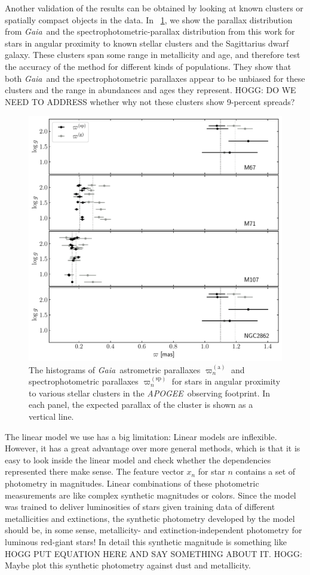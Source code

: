 \documentclass[modern]{aastex62}
\newcommand{\acronym}[1]{{\small{#1}}}
\newcommand{\project}[1]{\textsl{#1}}
\newcommand{\apogee}{\project{\acronym{APOGEE}}}
\newcommand{\gaia}{\project{Gaia}}
\newcommand{\gparallax}{\varpi^{(\mathrm{a})}}
\newcommand{\sparallax}{\varpi^{(\mathrm{sp})}}
\begin{document}
Another validation of the results can be obtained by looking at known
clusters or spatially compact objects in the data.
In \figurename~\ref{fig:clusters}, we show the parallax distribution from \gaia\ and
the spectrophotometric-parallax distribution from this work for stars in
angular proximity to known stellar clusters and the Sagittarius dwarf
galaxy.
These clusters span some range in metallicity and age, and therefore test
the accuracy of the method for different kinds of populations.
They show that both \gaia\ and the spectrophotometric parallaxes appear to be unbiased
for these clusters and the range in abundances and ages they represent.
HOGG: DO WE NEED TO ADDRESS whether why not these clusters show 9-percent spreads?
\begin{figure}
\includegraphics[width=\textwidth]{clusters.pdf}
\caption{The histograms of \gaia\ astrometric parallaxes $\gparallax_n$
  and spectrophotometric parallaxes $\sparallax_n$ for stars in angular proximity
  to various stellar clusters in the \apogee\ observing footprint. In each panel,
  the expected parallax of the cluster is shown as a vertical line.\label{fig:clusters}}
\end{figure}

The linear model we use has a big limitation: Linear models are inflexible.
However, it has a great advantage over more general methods,
which is that it is easy to look inside
the linear model and check whether the dependencies represented there make sense.
The feature vector $x_n$ for star $n$
contains a set of photometry in magnitudes.
Linear combinations of these photometric measurements are like complex synthetic
magnitudes or colors.
Since the model was trained to deliver luminosities of stars given training data
of different metallicities and extinctions, the synthetic photometry developed
by the model should be, in some sense, metallicity- and extinction-independent
photometry for luminous red-giant stars!
In detail this synthetic magnitude is something like HOGG PUT EQUATION HERE AND
SAY SOMETHING ABOUT IT. HOGG: Maybe plot this synthetic photometry against dust
and metallicity.
\end{document}
